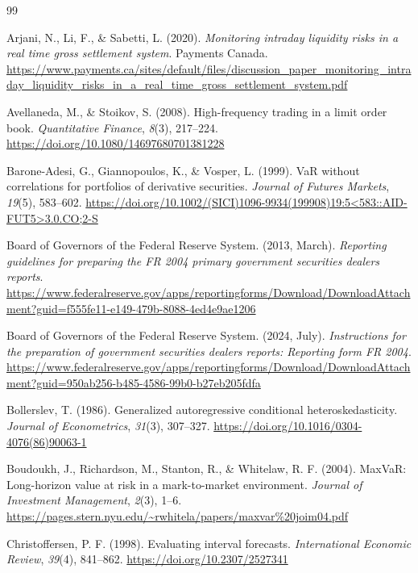 \documentclass[11pt,a4paper]{article}
\begin{document}
\begin{thebibliography}{99}
\raggedright
{} Arjani, N., Li, F., \& Sabetti, L. (2020). \emph{Monitoring intraday liquidity risks in a real time gross settlement system}. Payments Canada. \url{https://www.payments.ca/sites/default/files/discussion_paper_monitoring_intraday_liquidity_risks_in_a_real_time_gross_settlement_system.pdf}

 Avellaneda, M., \& Stoikov, S. (2008). High-frequency trading in a limit order book. \emph{Quantitative Finance}, \emph{8}(3), 217--224. \url{https://doi.org/10.1080/14697680701381228}

 Barone-Adesi, G., Giannopoulos, K., \& Vosper, L. (1999). VaR without correlations for portfolios of derivative securities. \emph{Journal of Futures Markets}, \emph{19}(5), 583--602. \url{https://doi.org/10.1002/(SICI)1096-9934(199908)19:5<583::AID-FUT5>3.0.CO;2-S}

 Board of Governors of the Federal Reserve System. (2013, March). \emph{Reporting guidelines for preparing the FR 2004 primary government securities dealers reports}. \url{https://www.federalreserve.gov/apps/reportingforms/Download/DownloadAttachment?guid=f555fe11-e149-479b-8088-4ed4e9ae1206}

 Board of Governors of the Federal Reserve System. (2024, July). \emph{Instructions for the preparation of government securities dealers reports: Reporting form FR 2004}. \url{https://www.federalreserve.gov/apps/reportingforms/Download/DownloadAttachment?guid=950ab256-b485-4586-99b0-b27eb205fdfa}

 Bollerslev, T. (1986). Generalized autoregressive conditional heteroskedasticity. \emph{Journal of Econometrics}, \emph{31}(3), 307--327. \url{https://doi.org/10.1016/0304-4076(86)90063-1}

 Boudoukh, J., Richardson, M., Stanton, R., \& Whitelaw, R. F. (2004). MaxVaR: Long-horizon value at risk in a mark-to-market environment. \emph{Journal of Investment Management}, \emph{2}(3), 1--6. \url{https://pages.stern.nyu.edu/~rwhitela/papers/maxvar%20joim04.pdf}

 Christoffersen, P. F. (1998). Evaluating interval forecasts. \emph{International Economic Review}, \emph{39}(4), 841--862. \url{https://doi.org/10.2307/2527341}


\end{thebibliography}
\end{document}
